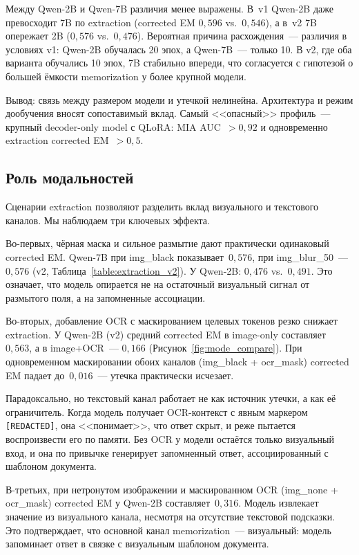 \documentclass[a4paper,12pt]{extarticle}
\begin{document}
Между Qwen-2B и Qwen-7B различия менее выражены. В~v1 Qwen-2B даже превосходит 7B по extraction (corrected EM $0{,}596$ vs.\ $0{,}546$), а в~v2 7B опережает 2B ($0{,}576$ vs.\ $0{,}476$). Вероятная причина расхождения~--- различия в условиях v1: Qwen-2B обучалась 20 эпох, а Qwen-7B~--- только 10. В v2, где оба варианта обучались 10 эпох, 7B стабильно впереди, что согласуется с гипотезой о большей ёмкости memorization у более крупной модели.

Вывод: связь между размером модели и утечкой нелинейна. Архитектура и режим дообучения вносят сопоставимый вклад. Самый <<опасный>> профиль~--- крупный decoder-only model с QLoRA: MIA AUC~$> 0{,}92$ и одновременно extraction corrected EM~$> 0{,}5$.

\subsection{Роль модальностей}
\label{sec:discussion_modalities}

Сценарии extraction позволяют разделить вклад визуального и текстового каналов. Мы наблюдаем три ключевых эффекта.

Во-первых, чёрная маска и сильное размытие дают практически одинаковый corrected EM. Qwen-7B при img\_black показывает~$0{,}576$, при img\_blur\_50~--- $0{,}576$ (v2, Таблица~\ref{table:extraction_v2}). У Qwen-2B: $0{,}476$ vs.\ $0{,}491$. Это означает, что модель опирается не на остаточный визуальный сигнал от размытого поля, а на запомненные ассоциации.

Во-вторых, добавление OCR с маскированием целевых токенов резко снижает extraction. У Qwen-2B (v2) средний corrected EM в image-only составляет~$0{,}563$, а в image+OCR~--- $0{,}166$ (Рисунок~\ref{fig:mode_compare}). При одновременном маскировании обоих каналов (img\_black + ocr\_mask) corrected EM падает до~$0{,}016$~--- утечка практически исчезает.

Парадоксально, но текстовый канал работает не как источник утечки, а как её ограничитель. Когда модель получает OCR-контекст с явным маркером \texttt{[REDACTED]}, она <<понимает>>, что ответ скрыт, и реже пытается воспроизвести его по памяти. Без OCR у модели остаётся только визуальный вход, и она по привычке генерирует запомненный ответ, ассоциированный с шаблоном документа.

В-третьих, при нетронутом изображении и маскированном OCR (img\_none + ocr\_mask) corrected EM у Qwen-2B составляет~$0{,}316$. Модель извлекает значение из визуального канала, несмотря на отсутствие текстовой подсказки. Это подтверждает, что основной канал memorization~--- визуальный: модель запоминает ответ в связке с визуальным шаблоном документа.
\end{document}
